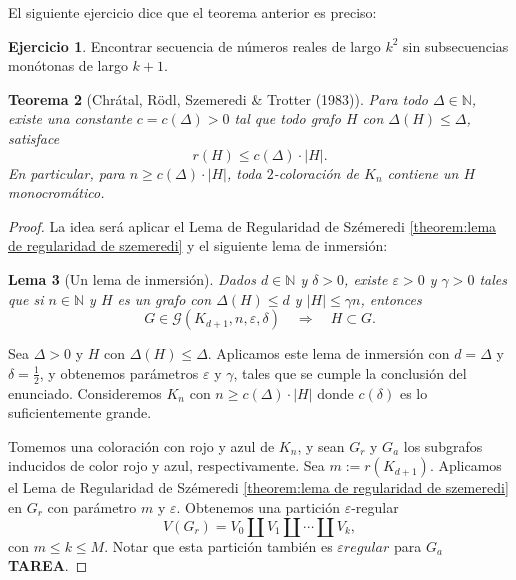 \documentclass[12pt]{report}
\theoremstyle{plain}
\newtheorem{theorem}{Teorema}[section]
\newtheorem{lemma}[theorem]{Lema}
\theoremstyle{definition}
\newtheorem{exercise}[theorem]{Ejercicio}
\newcommand{\red}[1]{\textcolor{BrickRed}{#1}}
\newcommand{\naturals}{\mathbb{N}}
\newcommand{\abs}[1]{\left \vert #1 \right \vert}
\begin{document}
El siguiente ejercicio dice que el teorema anterior es preciso:
\begin{exercise}
Encontrar secuencia de números reales de largo $k^2$ sin subsecuencias monótonas de largo $k+1$.
\end{exercise}




\begin{theorem}[Chrátal, Rödl, Szemeredi \& Trotter (1983)]
Para todo $\Delta \in \naturals$, existe una constante $c = c(\Delta)>0$ tal que todo grafo $H$ con $\Delta (H) \leq \Delta$, satisface
\[
    r(H) \leq c(\Delta) \cdot \abs H.
\]
En particular, para $n \geq c(\Delta) \cdot \abs H$, toda $2$-coloración de $K_n$ contiene un $H$ monocromático.
\end{theorem}

\begin{proof}
La idea será aplicar el Lema de Regularidad de Szémeredi \ref{theorem:lema de regularidad de szemeredi} y el siguiente lema de inmersión:


\begin{lemma}[Un lema de inmersión]\label{lema:un lema de inmersion para numeros de ramsey}
Dados $d \in \naturals$ y $\delta >0$, existe $\varepsilon > 0$ y $\gamma > 0$ tales que si $n \in \naturals$ y $H$ es un grafo con $\Delta (H) \leq d$ y $\abs H \leq \gamma n$, entonces
\[
    G \in \mathcal G (K_{d+1}, n , \varepsilon , \delta) \quad \Longrightarrow \quad H \subset G    .
\]
\end{lemma}

Sea $\Delta > 0$ y $H$ con $\Delta (H) \leq \Delta$. Aplicamos este lema de inmersión con $d = \Delta$ y $\delta = \frac{1 }{2}$, y obtenemos parámetros $\varepsilon$ y $\gamma$, tales que se cumple la conclusión del enunciado. Consideremos $K_n$ con $n \geq c(\Delta) \cdot \abs H$ donde $c(\delta) $ es lo suficientemente grande.

Tomemos una coloración con rojo y azul de $K_n$, y sean $G_r$ y $G_a$ los subgrafos inducidos de color rojo y azul, respectivamente. Sea $m := r(K_{d+1})$. Aplicamos el Lema de Regularidad de Szémeredi \ref{theorem:lema de regularidad de szemeredi} en $G_r$ con parámetro $m$ y $\varepsilon$. Obtenemos una partición $\varepsilon$-regular
\[
    V(G_r) = V_0 \coprod V_1 \coprod \cdots \coprod V_k,
\]
con $m \leq k \leq M$. Notar que esta partición también es $\varepsilon regular$ para $G_a$ \red{\textbf{TAREA}}.


\end{proof}
\end{document}
